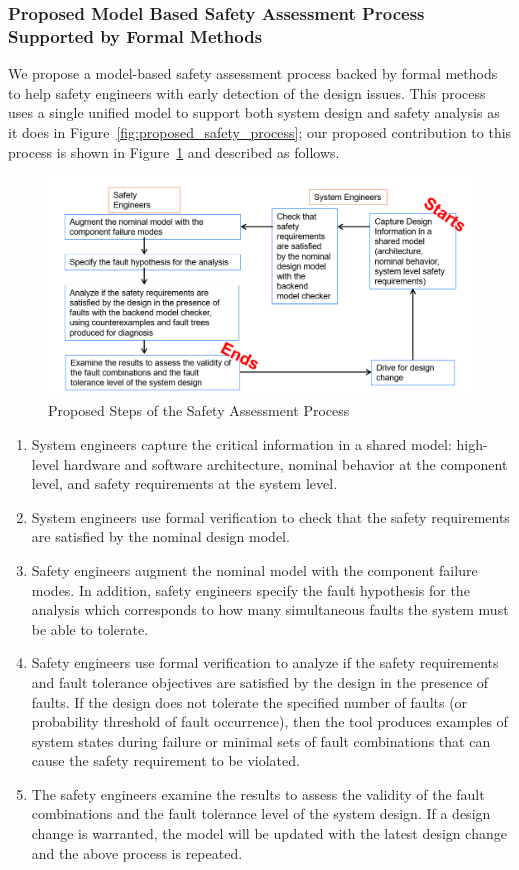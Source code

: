 \subsubsection{Proposed Model Based Safety Assessment Process Supported by Formal Methods}
We propose a model-based safety assessment process backed by formal methods to help safety engineers with early detection of the design issues.  This process uses a single unified model to support both system design and safety analysis as it does in Figure~\ref{fig:proposed_safety_process}; our proposed contribution to this process is shown in Figure~\ref{fig:SACycle1} and described as follows.
\begin{figure}[h]
	\begin{center}
		\includegraphics[width=\textwidth]{images/SACycle.PNG}
	\end{center}
	\caption{Proposed Steps of the Safety Assessment Process}
	\label{fig:SACycle1}
\end{figure}
\begin{enumerate}
	\item System engineers capture the critical information in a shared model:  high-level hardware and software architecture, nominal behavior at the component level, and safety requirements at the system level.
	\item System engineers use formal verification to check that the safety requirements are satisfied by the nominal design model. 
	\item Safety engineers augment the nominal model with the component failure modes. In addition, safety engineers specify the fault hypothesis for the analysis which corresponds to how many simultaneous faults the system must be able to tolerate.
	\item Safety engineers use formal verification to analyze if the safety requirements and fault tolerance objectives are satisfied by the design in the presence of faults. If the design does not tolerate the specified number of faults (or probability threshold of fault occurrence), then the tool produces examples of system states during failure or minimal sets of fault combinations that can cause the safety requirement to be violated.
	\item The safety engineers examine the results to assess the validity of the fault combinations and the fault tolerance level of the system design. If a design change is warranted, the model will be updated with the latest design change and the above process is repeated.
\end{enumerate}

